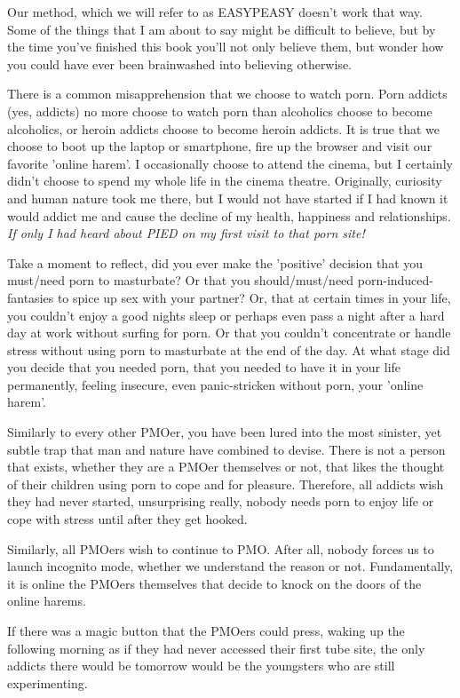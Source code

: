 \documentclass[easypeasy.tex]{subfiles}
\begin{document}
Our method, which we will refer to as EASYPEASY doesn't work that way. Some of the things that I am about to say might be difficult to believe, but by the time you've finished this book you'll not only believe them, but wonder how you could have ever been brainwashed into believing otherwise.

There is a common misapprehension that we choose to watch porn. Porn addicts (yes, addicts) no more choose to watch porn than alcoholics choose to become alcoholics, or heroin addicts choose to become heroin addicts. It is true that we choose to boot up the laptop or smartphone, fire up the browser and visit our favorite 'online harem'. I occasionally choose to attend the cinema, but I certainly didn't choose to spend my whole life in the cinema theatre. Originally, curiosity and human nature took me there, but I would not have started if I had known it would addict me and cause the decline of my health, happiness and relationships.
\textit{If only I had heard about PIED on my first visit to that porn site!}

Take a moment to reflect, did you ever make the 'positive' decision that you must/need porn to masturbate? Or that you should/must/need porn-induced-fantasies to spice up sex with your partner? Or, that at certain times in your life, you couldn't enjoy a good nights sleep or perhaps even pass a night after a hard day at work without surfing for porn. Or that you couldn't concentrate or handle stress without using porn to masturbate at the end of the day. At what stage did you decide that you needed porn, that you needed to have it in your life permanently, feeling insecure, even panic-stricken without porn, your 'online harem'.

Similarly to every other PMOer, you have been lured into the most sinister, yet subtle trap that man and nature have combined to devise. There is not a person that exists, whether they are a PMOer themselves or not, that likes the thought of their children using porn to cope and for pleasure. Therefore, all addicts wish they had never started, unsurprising really, nobody needs porn to enjoy life or cope with stress until after they get hooked.

Similarly, all PMOers wish to continue to PMO. After all, nobody forces us to launch incognito mode, whether we understand the reason or not. Fundamentally, it is online the PMOers themselves that decide to knock on the doors of the online harems.

If there was a magic button that the PMOers could press, waking up the following morning as if they had never accessed their first tube site, the only addicts there would be tomorrow would be the youngsters who are still experimenting.
\end{document}
